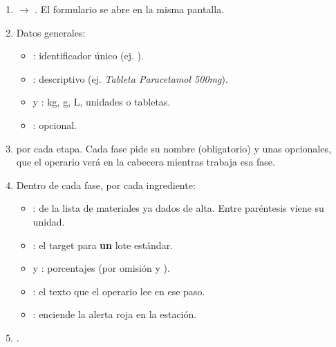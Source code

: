 \newpage
{}


\begin{enumerate}
    \item {} $\rightarrow$ . El formulario se abre en
          la misma pantalla.
    \item Datos generales:
        \begin{itemize}
            \item {}: identificador único (ej. ).
            \item {}: descriptivo (ej. \textit{Tableta Paracetamol 500mg}).
            \item {} y : kg, g, L, unidades
                  o tabletas.
            \item {}: opcional.
        \end{itemize}
    \item {} por cada etapa. Cada fase pide su nombre (obligatorio)
          y unas  opcionales, que el operario verá en la
          cabecera mientras trabaja esa fase.
    \item Dentro de cada fase,  por cada ingrediente:
        \begin{itemize}
            \item {}: de la lista de materiales ya dados de alta.
                  Entre paréntesis viene su unidad.
            \item {}: el target para \textbf{un} lote estándar.
            \item {} y : porcentajes (por omisión  y ).
            \item {}: el texto que el operario lee en ese paso.
            \item {}: enciende la alerta roja en la estación.
        \end{itemize}
    \item {}.
\end{enumerate}


